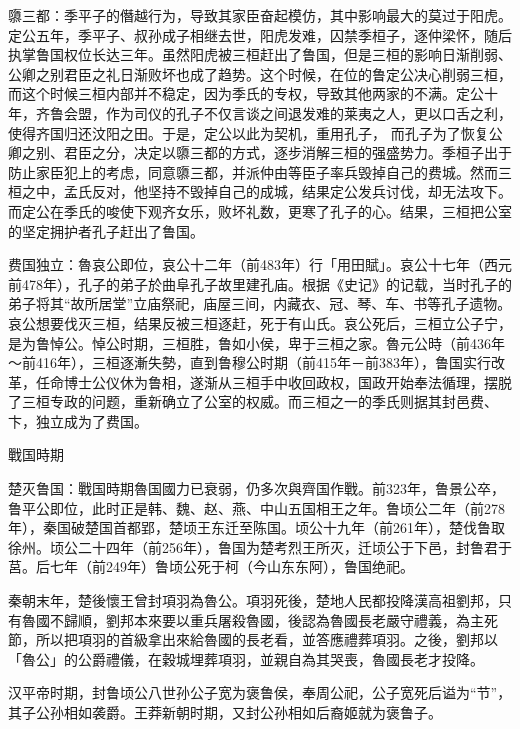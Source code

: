 隳三都：季平子的僭越行为，导致其家臣奋起模仿，其中影响最大的莫过于阳虎。定公五年，季平子、叔孙成子相继去世，阳虎发难，囚禁季桓子，逐仲梁怀，随后执掌鲁国权位长达三年。虽然阳虎被三桓赶出了鲁国，但是三桓的影响日渐削弱、公卿之别君臣之礼日渐败坏也成了趋势。这个时候，在位的鲁定公决心削弱三桓，而这个时候三桓内部并不稳定，因为季氏的专权，导致其他两家的不满。定公十年，齐鲁会盟，作为司仪的孔子不仅言谈之间退发难的莱夷之人，更以口舌之利，使得齐国归还汶阳之田。于是，定公以此为契机，重用孔子， 而孔子为了恢复公卿之别、君臣之分，决定以隳三都的方式，逐步消解三桓的强盛势力。季桓子出于防止家臣犯上的考虑，同意隳三都，并派仲由等臣子率兵毁掉自己的费城。然而三桓之中，孟氏反对，他坚持不毁掉自己的成城，结果定公发兵讨伐，却无法攻下。而定公在季氏的唆使下观齐女乐，败坏礼数，更寒了孔子的心。结果，三桓把公室的坚定拥护者孔子赶出了鲁国。

费国独立：魯哀公即位，哀公十二年（前483年）行「用田賦」。哀公十七年（西元前478年），孔子的弟子於曲阜孔子故里建孔庙。根据《史记》的记载，当时孔子的弟子将其“故所居堂”立庙祭祀，庙屋三间，内藏衣、冠、琴、车、书等孔子遗物。哀公想要伐灭三桓，结果反被三桓逐赶，死于有山氏。哀公死后，三桓立公子宁，是为鲁悼公。悼公时期，三桓胜，鲁如小侯，卑于三桓之家。魯元公時（前436年～前416年），三桓逐漸失勢，直到鲁穆公时期（前415年－前383年），鲁国实行改革，任命博士公仪休为鲁相，遂渐从三桓手中收回政权，国政开始奉法循理，摆脱了三桓专政的问题，重新确立了公室的权威。而三桓之一的季氏则据其封邑费、卞，独立成为了费国。

戰国時期

楚灭鲁国：戰国時期魯国國力已衰弱，仍多次與齊国作戰。前323年，鲁景公卒，鲁平公即位，此时正是韩、魏、赵、燕、中山五国相王之年。鲁顷公二年（前278年），秦国破楚国首都郢，楚顷王东迁至陈国。顷公十九年（前261年），楚伐鲁取徐州。顷公二十四年（前256年），鲁国为楚考烈王所灭，迁顷公于下邑，封鲁君于莒。后七年（前249年）鲁顷公死于柯（今山东东阿），鲁国绝祀。

秦朝末年，楚後懷王曾封項羽為魯公。項羽死後，楚地人民都投降漢高祖劉邦，只有魯國不歸順，劉邦本來要以重兵屠殺魯國，後認為魯國長老嚴守禮義，為主死節，所以把項羽的首級拿出來給魯國的長老看，並答應禮葬項羽。之後，劉邦以「魯公」的公爵禮儀，在穀城埋葬項羽，並親自為其哭喪，魯國長老才投降。

汉平帝时期，封鲁顷公八世孙公子宽为褒鲁侯，奉周公祀，公子宽死后谥为“节”，其子公孙相如袭爵。王莽新朝时期，又封公孙相如后裔姬就为褒鲁子。



% 
% 
% 
% 
% 
% 
% 
% 
% 
% 
% 
% 
% 
% 


